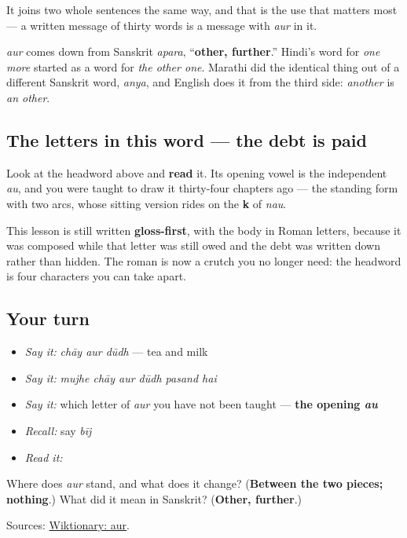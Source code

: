 It joins two whole sentences the same way, and that is the use that matters most — a written message of thirty words is a message with \emph{aur} in it.

\emph{aur} comes down from Sanskrit \emph{apara}, \textquotedblleft{}\textbf{other, further}.\textquotedblright{} Hindi's word for \emph{one more} started as a word for \emph{the other one}. Marathi did the identical thing out of a different Sanskrit word, \emph{anya}, and English does it from the third side: \emph{another} is \emph{an other}.

\subsection*{The letters in this word — the debt is paid}
Look at the headword above and \textbf{read} it. Its opening vowel is the independent \emph{au}, and you were taught to draw it thirty-four chapters ago — the standing form with two arcs, whose sitting version rides on the \textbf{k} of \emph{nau}.

This lesson is still written \textbf{gloss-first}, with the body in Roman letters, because it was composed while that letter was still owed and the debt was written down rather than hidden. The roman is now a crutch you no longer need: the headword is four characters you can take apart.

\subsection*{Your turn}
\begin{itemize}
\raggedright
  \item \emph{Say it:} \emph{chāy aur dūdh} — tea and milk
  \item \emph{Say it:} \emph{mujhe chāy aur dūdh pasand hai}
  \item \emph{Say it:} which letter of \emph{aur} you have not been taught — \textbf{the opening \emph{au}}
  \item \emph{Recall:} say \emph{bīj}
  \item \emph{Read it:} \textbf{}
\end{itemize}

\begin{tcolorbox}[breakable,colback=teal!4,colframe=teal!35!black,title={Before you move on}]
Where does \emph{aur} stand, and what does it change? (\textbf{Between the two pieces; nothing}.) What did it mean in Sanskrit? (\textbf{Other, further}.)

Sources: \href{https://en.wiktionary.org/wiki/\%E0\%A4\%94\%E0\%A4\%B0}{Wiktionary: aur}.
\end{tcolorbox}
